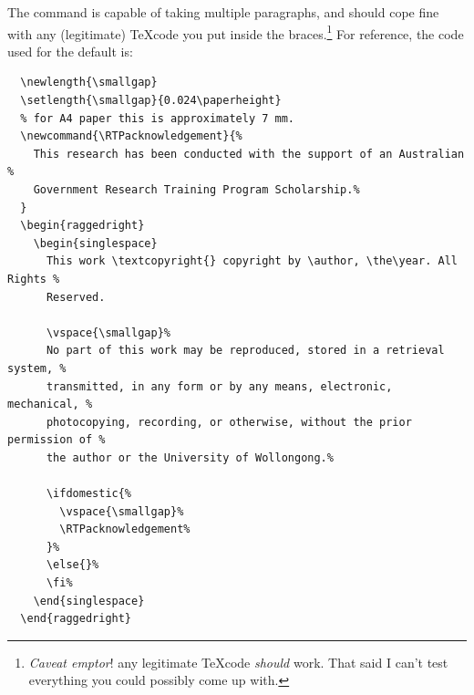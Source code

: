\documentclass[12pt,oneside]{article}
\begin{document}
\begin{description}
    The command is capable of taking multiple paragraphs, and should cope fine with any (legitimate) \TeX code you put inside the braces.\footnote{\emph{Caveat emptor}! any legitimate \TeX code \emph{should} work. That said I can't test everything you could possibly come up with.} For reference, the code used for the default is:
\begin{lstlisting}
  \newlength{\smallgap}
  \setlength{\smallgap}{0.024\paperheight}
  % for A4 paper this is approximately 7 mm.
  \newcommand{\RTPacknowledgement}{%
    This research has been conducted with the support of an Australian %
    Government Research Training Program Scholarship.%
  }
  \begin{raggedright}
    \begin{singlespace}
      This work \textcopyright{} copyright by \author, \the\year. All Rights %
      Reserved.
  
      \vspace{\smallgap}%
      No part of this work may be reproduced, stored in a retrieval system, %
      transmitted, in any form or by any means, electronic, mechanical, %
      photocopying, recording, or otherwise, without the prior permission of %
      the author or the University of Wollongong.%
  
      \ifdomestic{%
        \vspace{\smallgap}%
        \RTPacknowledgement%
      }%
      \else{}%
      \fi%
    \end{singlespace}
  \end{raggedright}
\end{lstlisting}

\end{description}
\end{document}
